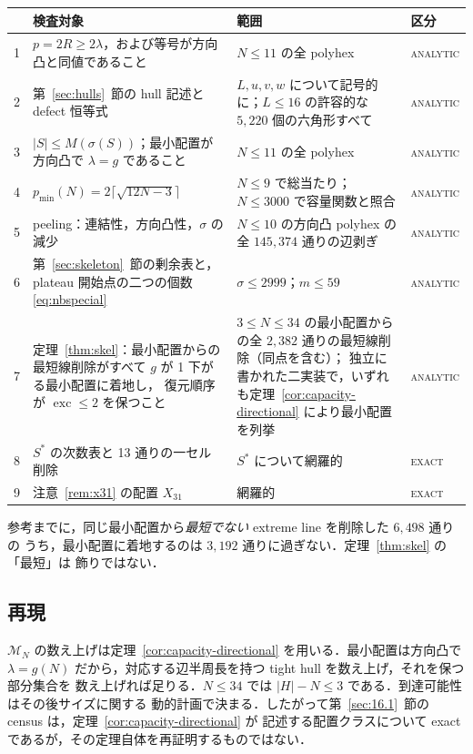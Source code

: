 \documentclass[11pt]{article}
\theoremstyle{plain}
\theoremstyle{definition}
\theoremstyle{remark}
\DeclareMathOperator{\exc}{exc}
\begin{document}
\begin{center}
\footnotesize
\begin{tabularx}{\linewidth}{@{}l>{\raggedright\arraybackslash}X>{\raggedright\arraybackslash}Xl@{}}
\toprule
 & 検査対象 & 範囲 & 区分 \\
\midrule
1 & \(p=2R\ge2\lambda\)，および等号が方向凸と同値であること &
\(N\le11\) の全 polyhex & \textsc{analytic} \\
2 & 第~\ref{sec:hulls}~節の hull 記述と defect 恒等式 &
\(L,u,v,w\) について記号的に；\(L\le16\) の許容的な \(5{,}220\) 個の六角形すべて &
\textsc{analytic} \\
3 & \(|S|\le M(\sigma(S))\)；最小配置が方向凸で \(\lambda=g\) であること &
\(N\le11\) の全 polyhex & \textsc{analytic} \\
4 & \(p_{\min}(N)=2\lceil\sqrt{12N-3}\rceil\) &
\(N\le9\) で総当たり；\(N\le3000\) で容量関数と照合 & \textsc{analytic} \\
5 & peeling：連結性，方向凸性，\(\sigma\) の減少 &
\(N\le10\) の方向凸 polyhex の全 \(145{,}374\) 通りの辺剥ぎ & \textsc{analytic} \\
6 & 第~\ref{sec:skeleton}~節の剰余表と，plateau 開始点の二つの個数 \eqref{eq:nbspecial} &
\(\sigma\le2999\)；\(m\le59\) & \textsc{analytic} \\
7 & 定理~\ref{thm:skel}：最小配置からの最短線削除がすべて \(g\) が 1 下がる最小配置に着地し，
復元順序が \(\exc\le2\) を保つこと &
\(3\le N\le34\) の最小配置からの全 \(2{,}382\) 通りの最短線削除（同点を含む）；
独立に書かれた二実装で，いずれも定理~\ref{cor:capacity-directional} により最小配置を列挙 &
\textsc{analytic} \\
8 & \(S^{*}\) の次数表と 13 通りの一セル削除 & \(S^{*}\) について網羅的 & \textsc{exact} \\
9 & 注意~\ref{rem:x31} の配置 \(X_{31}\) & 網羅的 & \textsc{exact} \\
\bottomrule
\end{tabularx}
\end{center}

参考までに，同じ最小配置から\emph{最短でない} extreme line を削除した \(6{,}498\) 通りの
うち，最小配置に着地するのは \(3{,}192\) 通りに過ぎない．定理~\ref{thm:skel} の「最短」は
飾りではない．

\subsection{再現}\label{sec:16.4}

\(\mathcal{M}_{N}\) の数え上げは定理~\ref{cor:capacity-directional} を用いる．最小配置は方向凸で
\(\lambda=g(N)\) だから，対応する辺半周長を持つ tight hull を数え上げ，それを保つ部分集合を
数え上げれば足りる．\(N\le34\) では \(|H|-N\le3\) である．到達可能性はその後サイズに関する
動的計画で決まる．したがって第~\ref{sec:16.1}~節の census は，定理~\ref{cor:capacity-directional} が
記述する配置クラスについて exact であるが，その定理自体を再証明するものではない．
\end{document}
